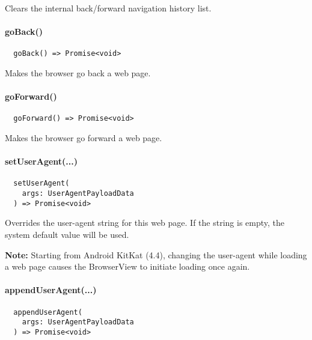 Clears the internal back/forward navigation history list.


\paragraph{goBack()}

\begin{verbatim}
  goBack() => Promise<void>
\end{verbatim}

Makes the browser go back a web page.


\paragraph{goForward()}

\begin{verbatim}
  goForward() => Promise<void>
\end{verbatim}

Makes the browser go forward a web page.


\paragraph{setUserAgent(...)}

\begin{verbatim}
  setUserAgent(
    args: UserAgentPayloadData
  ) => Promise<void>
\end{verbatim}

Overrides the user-agent string for this web page.
If the string is empty, the system default value will be used.

\textbf{Note:} Starting from Android KitKat (4.4), changing the user-agent while
loading a web page causes the BrowserView to initiate loading once again.~\cite{android:api}


\paragraph{appendUserAgent(...)}

\begin{verbatim}
  appendUserAgent(
    args: UserAgentPayloadData
  ) => Promise<void>
\end{verbatim}

